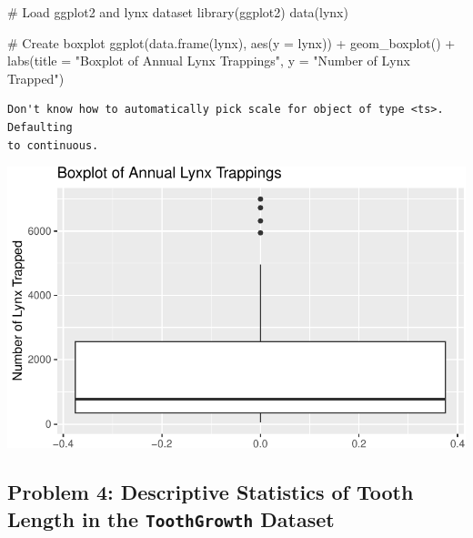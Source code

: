 \documentclass[
  letterpaper,
  DIV=11,
  numbers=noendperiod]{scrreprt}
\newenvironment{Shaded}{\begin{snugshade}}{\end{snugshade}}
\newcommand{\AttributeTok}[1]{\textcolor[rgb]{0.40,0.45,0.13}{#1}}
\newcommand{\CommentTok}[1]{\textcolor[rgb]{0.37,0.37,0.37}{#1}}
\newcommand{\FunctionTok}[1]{\textcolor[rgb]{0.28,0.35,0.67}{#1}}
\newcommand{\NormalTok}[1]{\textcolor[rgb]{0.00,0.23,0.31}{#1}}
\newcommand{\SpecialCharTok}[1]{\textcolor[rgb]{0.37,0.37,0.37}{#1}}
\newcommand{\StringTok}[1]{\textcolor[rgb]{0.13,0.47,0.30}{#1}}
\begin{document}
\begin{Shaded}
\begin{Highlighting}[]
\CommentTok{\# Load ggplot2 and lynx dataset}
\FunctionTok{library}\NormalTok{(ggplot2)}
\FunctionTok{data}\NormalTok{(lynx)}

\CommentTok{\# Create boxplot}
\FunctionTok{ggplot}\NormalTok{(}\FunctionTok{data.frame}\NormalTok{(lynx), }\FunctionTok{aes}\NormalTok{(}\AttributeTok{y =}\NormalTok{ lynx)) }\SpecialCharTok{+}
  \FunctionTok{geom\_boxplot}\NormalTok{() }\SpecialCharTok{+}
  \FunctionTok{labs}\NormalTok{(}\AttributeTok{title =} \StringTok{"Boxplot of Annual Lynx Trappings"}\NormalTok{, }\AttributeTok{y =} \StringTok{"Number of Lynx Trapped"}\NormalTok{)}
\end{Highlighting}
\end{Shaded}

\begin{verbatim}
Don't know how to automatically pick scale for object of type <ts>. Defaulting
to continuous.
\end{verbatim}

\includegraphics{Measures_of_Variability_files/figure-pdf/unnamed-chunk-17-1.pdf}

\subsection*{\texorpdfstring{Problem 4: Descriptive Statistics of Tooth
Length in the \texttt{ToothGrowth}
Dataset}{Problem 4: Descriptive Statistics of Tooth Length in the ToothGrowth Dataset}}\label{problem-4-descriptive-statistics-of-tooth-length-in-the-toothgrowth-dataset}
\end{document}
